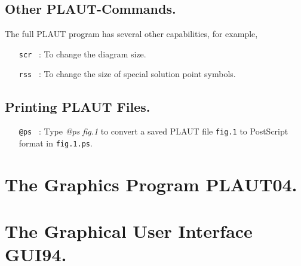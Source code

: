 \documentclass[12pt]{report}
\begin{document}
\section{ Other {\cal PLAUT}-Commands.} \label{sec:Other_PLAUT_commands}
The full {\cal PLAUT} program has several other capabilities, for example,

\begin{itemize}
\item[\tt scr]~:  To change the diagram size.
\item[\tt rss]~:  To change the size of special solution point symbols.
\end{itemize}


\section{ Printing {\cal PLAUT} Files.} \label{sec:Printing_PLAUT_files}
\begin{itemize}
\item[\tt @ps]~:
  Type {\it @ps fig.1} to convert a saved {\cal PLAUT} file {\tt fig.1} 
  to {\cal PostScript} format
  in {\tt fig.1.ps}.
\end{itemize}

 
\chapter{ The Graphics Program PLAUT04.} \label{ch:PLAUT04}

\newcommand{\PLAUT} {\textsc{Plaut04}}
\newcommand{\ETC} {\textit{etc.}}


\chapter{ The Graphical User Interface GUI94.} \label{ch:GUI}
\end{document}
